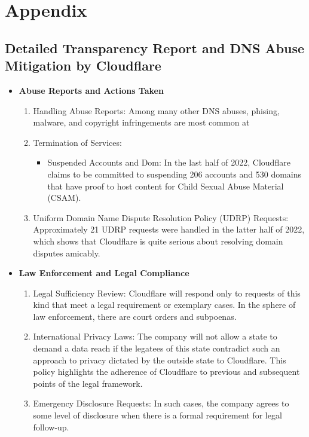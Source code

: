 \chapter{Appendix}

\section{Detailed Transparency Report and DNS Abuse Mitigation by Cloudflare}
\label{app:cloudfare}


\begin{itemize}
    \item \textbf{Abuse Reports and Actions Taken}
    \begin{enumerate}
        \item Handling Abuse Reports: Among many other DNS abuses, phising, malware, and copyright infringements are most common at 
        \item Termination of Services: 
        \begin{itemize}
            \item Suspended Accounts and Dom: In the last half of 2022, Cloudflare claims to be committed to suspending 206 accounts and 530 domains that have proof to host content for Child Sexual Abuse Material (CSAM).
        \end{itemize}
        \item  Uniform Domain Name Dispute Resolution Policy (UDRP) Requests: Approximately 21 UDRP requests were handled in the latter half of 2022, which shows that Cloudflare is quite serious about resolving domain disputes amicably.
        \end{enumerate}
    \item \textbf{Law Enforcement and Legal Compliance}
    \begin{enumerate}
        \item Legal Sufficiency Review: Cloudflare will respond only to requests of this kind that meet a legal requirement or exemplary cases. In the sphere of law enforcement, there are court orders and subpoenas.
        \item International Privacy Laws: The company will not allow a state to demand a data reach if the legatees of this state contradict such an approach to privacy dictated by the outside state to Cloudflare. This policy highlights the adherence of Cloudflare to previous and subsequent points of the legal framework.
        \item Emergency Disclosure Requests: In such cases, the company agrees to some level of disclosure when there is a formal requirement for legal follow-up.

\end{enumerate}
\end{itemize}
